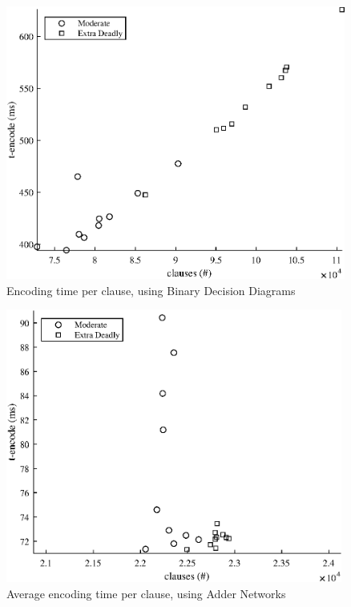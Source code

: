 \clearpage
\FloatBarrier
{
\renewcommand{\figurename}{Plot}

\begin{figure}
    \centering
    \vspace{8.7mm}
    \includegraphics[height = 90mm]{Figures/killer_BDD_encode.eps}
    \caption{Encoding time per clause, using Binary Decision Diagrams}
    \label{killerBDDencode}
\end{figure}

\begin{figure}
    \centering
    \vspace{11mm}
    \includegraphics[height = 90mm]{Figures/killer_AN_encode.eps}
    \caption{Average encoding time per clause, using Adder Networks}
    \label{killerANencode}
\end{figure}

}
